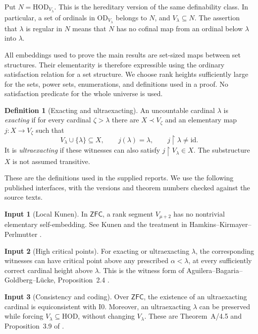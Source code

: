 \documentclass[11pt,letterpaper]{article}
\theoremstyle{definition}
\newtheorem{definition}{Definition}[section]
\newtheorem{inputthm}{Input}
\numberwithin{equation}{section}
\newcommand{\ZFC}{\mathsf{ZFC}}
\newcommand{\HOD}{\mathrm{HOD}}
\newcommand{\OD}{\mathrm{OD}}
\newcommand{\id}{\mathrm{id}}
\newcommand{\restr}{\mathbin{\upharpoonright}}
\newcommand{\Izero}{\mathrm{I0}}
\newcommand{\NN}{\HOD_{V_\lambda}}
\begin{document}
Put $N=\NN$. This is the hereditary version of the same definability class. In particular, a set of ordinals in $\OD_{V_\lambda}$ belongs to $N$, and $V_\lambda\subseteq N$. The assertion that $\lambda$ is regular in $N$ means that $N$ has no cofinal map from an ordinal below $\lambda$ into $\lambda$.

All embeddings used to prove the main results are set-sized maps between set structures. Their elementarity is therefore expressible using the ordinary satisfaction relation for a set structure. We choose rank heights sufficiently large for the sets, power sets, enumerations, and definitions used in a proof. No satisfaction predicate for the whole universe is used.

\begin{definition}[Exacting and ultraexacting]\label{def:exacting}
An uncountable cardinal $\lambda$ is \emph{exacting} if for every cardinal $\zeta>\lambda$ there are $X\prec V_\zeta$ and an elementary map $j:X\to V_\zeta$ such that
\[
 V_\lambda\cup\{\lambda\}\subseteq X,\qquad
 j(\lambda)=\lambda,\qquad j\restr\lambda\ne\id.
\]
It is \emph{ultraexacting} if these witnesses can also satisfy $j\restr V_\lambda\in X$. The substructure $X$ is not assumed transitive.
\end{definition}

These are the definitions used in the supplied reports. We use the following published interfaces, with the versions and theorem numbers checked against the source texts.

\begin{inputthm}[Local Kunen]\label{in:kunen}
In $\ZFC$, a rank segment $V_{\mu+2}$ has no nontrivial elementary self-embedding. See Kunen and the treatment in Hamkins--Kirmayer--Perlmutter \cite{kunen,hkp}.
\end{inputthm}

\begin{inputthm}[High critical points]\label{in:high}
For exacting or ultraexacting $\lambda$, the corresponding witnesses can have critical point above any prescribed $\alpha<\lambda$, at every sufficiently correct cardinal height above $\lambda$. This is the witness form of Aguilera--Bagaria--Goldberg--L\"ucke, Proposition~2.4 \cite{abgl}.
\end{inputthm}

\begin{inputthm}[Consistency and coding]\label{in:consistency}
Over $\ZFC$, the existence of an ultraexacting cardinal is equiconsistent with $\Izero$. Moreover, an ultraexacting $\lambda$ can be preserved while forcing $V_\lambda\subseteq\HOD$, without changing $V_\lambda$. These are Theorem~A/4.5 and Proposition~3.9 of \cite{abgl}.
\end{inputthm}
\end{document}
